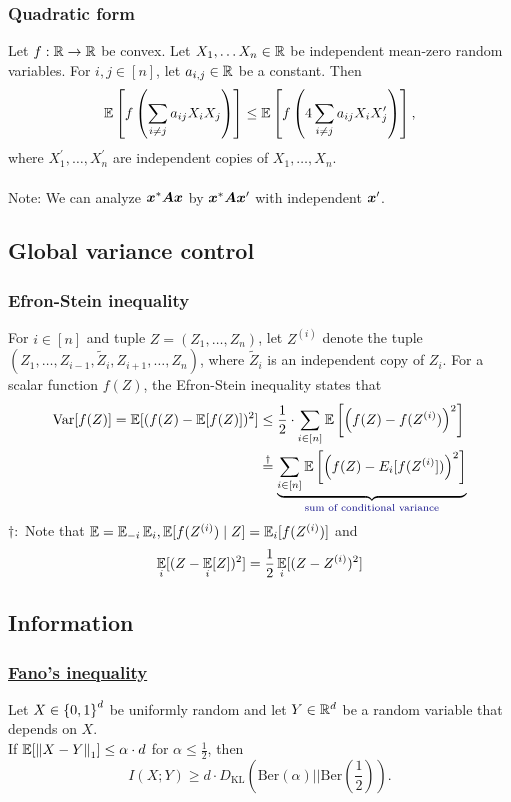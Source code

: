 \documentclass[10pt]{article}
\begin{document}
\subsubsection{Quadratic form}
Let $f: \mathbb{R} \to \mathbb{R}$ be convex. Let $X_1, \dots X_n \in \mathbb{R}$ be independent mean-zero random variables. For $i,j \in [n]$, let $a_{i,j} \in \mathbb{R}$ be a constant. Then 
\begin{equation}
    \mathop{\mathbb{E} \displaystyle} \left[ f \left( \sum_{i \neq j} a_{ij} X_i X_j \right) \right] \leq \mathop{\mathbb{E} \displaystyle} \left[ f \left( 4 \sum_{i \neq j} a_{ij} X_i X_j^{\prime} \right)\right],
\end{equation}
where $X_1^{\prime}, \dots, X_n^{\prime}$ are independent copies of $X_1, \dots, X_n$. \\~\\
Note: We can analyze ${\bm{x}}^* {\bm{A}} {\bm{x}}$ by ${\bm{x}}^* {\bm{A}} {\bm{x}}^{\prime}$ with independent ${\bm{x}}^{\prime}$. 
\subsection{Global variance control} 
\subsubsection{Efron-Stein inequality} 
For $i \in [n]$ and tuple $Z = (Z_1, \dots, Z_n)$, let $Z^{(i)}$ denote the tuple $(Z_1, \dots, Z_{i-1}, \tilde{Z}_i, Z_{i+1}, \dots, Z_n)$, where $\tilde{Z}_i$ is an independent copy of $Z_i$. For a scalar function $f(Z)$, the Efron-Stein inequality states that 
\begin{align}
    \Var[f(Z)] = \E[(f(Z) - \E[f(Z)])^2] &\leq \frac{1}{2} \cdot \sum_{i \in [n]} \E \left[ \left( f(Z) - f(Z^{(i)}) \right)^2 \right]  \\ &\overset{\dagger}{=} \underbrace{\sum_{i \in [n]} \E \left[ \left( f(Z) - E_i[f(Z^{(i)}]) \right)^2\right]}_{\memo{sum of conditional variance}}
\end{align}
$\dagger:$ Note that $\E = \E_{-i} \E_{i}, \E[f(Z^{(i)} )\given Z] = \E_i[f(Z^{(i)})]$ and 
\begin{equation}
\mathop{\mathbb{E} \displaystyle}_i [ (Z- \mathop{\mathbb{E} \displaystyle}_i[Z])^2] = \frac{1}{2} \mathop{\mathbb{E} \displaystyle}_i [(Z - Z^{(i)})^2]
\end{equation}
\subsection{Information}
\subsubsection{\href{https://bsky.app/profile/stein.ke/post/3ldbzzckjj225}{Fano's inequality}} Let $X\in \left\{ 0,1 \right\}^d$ be uniformly random and let $Y \in \mathbb{R}^d$ be a random variable that depends on $X$. \\ 
If $\mathop{\mathbb{E} \displaystyle} [ \left\lVert X-Y\right\rVert_1] \leq \alpha \cdot d$ for $\alpha \leq \frac{1}{2}$, then 
\begin{equation}
    I(X; Y) \geq d \cdot D_{\text{KL}} \left( \text{Ber}(\alpha) || \text{Ber} \left( \frac{1}{2}\right) \right). 
\end{equation}
\end{document}
